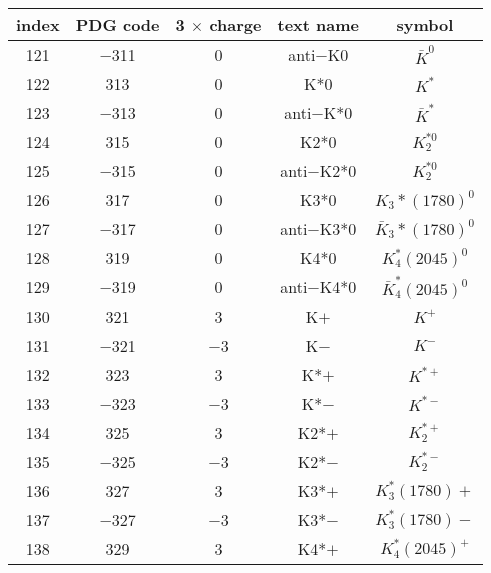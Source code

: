 \documentclass{article}
\begin{document}
\begin{table}[!htbp]
\centering
\begin{tabular}{|c|c|c|c|c|}
\hline
index & PDG code & 3 $\times$ charge & text name & symbol \\
\hline
121 & $-$311 & 0 & anti$-$K0 & $\bar{K}^{0}$ \\
\hline
122 & 313 & 0 & K*0 & $K^{*}$ \\
\hline
123 & $-$313 & 0 & anti$-$K*0 & $\bar{K}^{*}$ \\
\hline
124 & 315 & 0 & K\underline{\hspace{0.6em}}2*0 & $K_2^{*0}$ \\
\hline
125 & $-$315 & 0 & anti$-$K\underline{\hspace{0.6em}}2*0 & $K_2^{*0}$ \\
\hline
126 & 317 & 0 & K\underline{\hspace{0.6em}}3*0 & $K_{3}{*}(1780)^{0}$ \\
\hline
127 & $-$317 & 0 & anti$-$K\underline{\hspace{0.6em}}3*0 & $\bar{K}_{3}{*}(1780)^{0}$ \\
\hline
128 & 319 & 0 & K\underline{\hspace{0.6em}}4*0 & $K_{4}^{*}(2045)^{0}$ \\
\hline
129 & $-$319 & 0 & anti$-$K\underline{\hspace{0.6em}}4*0 & $\bar{K}_{4}^{*}(2045)^{0}$ \\
\hline
130 & 321 & 3 & K$+$ & $K^{+}$ \\
\hline
131 & $-$321 & $-$3 & K$-$ & $K^{-}$ \\
\hline
132 & 323 & 3 & K*$+$ & $K^{*+}$ \\
\hline
133 & $-$323 & $-$3 & K*$-$ & $K^{*-}$ \\
\hline
134 & 325 & 3 & K\underline{\hspace{0.6em}}2*$+$ & $K_2^{*+}$ \\
\hline
135 & $-$325 & $-$3 & K\underline{\hspace{0.6em}}2*$-$ & $K_2^{*-}$ \\
\hline
136 & 327 & 3 & K\underline{\hspace{0.6em}}3*$+$ & $K_{3}^{*}(1780){+}$ \\
\hline
137 & $-$327 & $-$3 & K\underline{\hspace{0.6em}}3*$-$ & $K_{3}^{*}(1780){-}$ \\
\hline
138 & 329 & 3 & K\underline{\hspace{0.6em}}4*$+$ & $K_{4}^{*}(2045)^{+}$ \\

\end{tabular}
\end{table}
\end{document}
